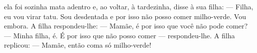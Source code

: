 

 ela foi sozinha mata
adentro e, ao voltar, à
tardezinha, disse à sua filha:\break
--- Filha, eu vou virar tatu. Sou
desdentada e por isso não posso
comer milho-verde. Vou embora.
A filha respondeu-lhe:\break
--- Mamãe, é por isso que
você não pode comer?\break
--- Minha filha, é. É por isso que
não posso comer --- respondeu-lhe.
A filha replicou:\break
--- Mamãe, então coma
só milho-verde!

\vspace{2em}

